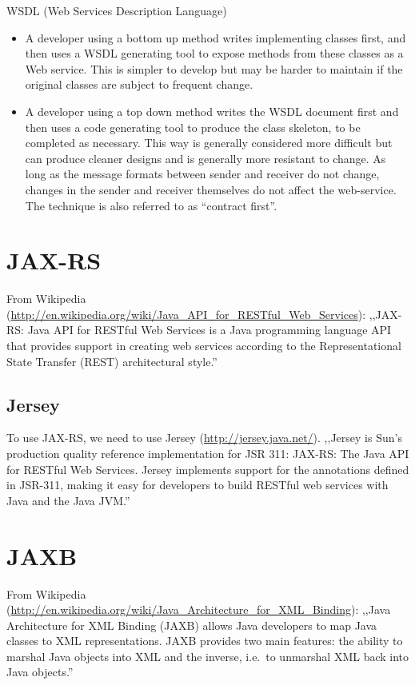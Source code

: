 \documentclass[]{report}
\begin{document}
WSDL (Web Services Description Language)

\begin{itemize}
\itemsep1pt\parskip0pt
\item
  A developer using a bottom up method writes implementing classes
  first, and then uses a WSDL generating tool to expose methods from
  these classes as a Web service. This is simpler to develop but may be
  harder to maintain if the original classes are subject to frequent
  change.
\item
  A developer using a top down method writes the WSDL document first and
  then uses a code generating tool to produce the class skeleton, to be
  completed as necessary. This way is generally considered more
  difficult but can produce cleaner designs and is generally more
  resistant to change. As long as the message formats between sender and
  receiver do not change, changes in the sender and receiver themselves
  do not affect the web-service. The technique is also referred to as
  ``contract first''.
\end{itemize}

\section{JAX-RS}

From Wikipedia
(\url{http://en.wikipedia.org/wiki/Java_API_for_RESTful_Web_Services}):
,,JAX-RS: Java API for RESTful Web Services is a Java programming
language API that provides support in creating web services according to
the Representational State Transfer (REST) architectural style.''

\subsection{Jersey}

To use JAX-RS, we need to use Jersey (\url{http://jersey.java.net/}).
,,Jersey is Sun's production quality reference implementation for JSR
311: JAX-RS: The Java API for RESTful Web Services. Jersey implements
support for the annotations defined in JSR-311, making it easy for
developers to build RESTful web services with Java and the Java JVM.''

\section{JAXB}

From Wikipedia
(\url{http://en.wikipedia.org/wiki/Java_Architecture_for_XML_Binding}):
,,Java Architecture for XML Binding (JAXB) allows Java developers to map
Java classes to XML representations. JAXB provides two main features:
the ability to marshal Java objects into XML and the inverse, i.e.~to
unmarshal XML back into Java objects.''
\end{document}
